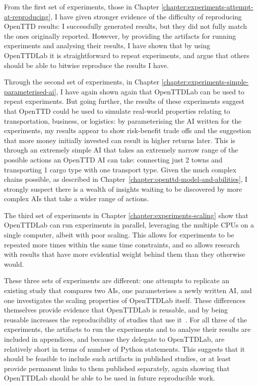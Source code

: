 \documentclass[logo,msc,dsti]{style/infthesis}    %
\begin{document}
{From the first set of experiments, those in Chapter \ref{chapter:experiments-attempt-at-reproducing}, I have given stronger evidence of the difficulty of reproducing OpenTTD results: I successfully generated results, but they did not fully match the ones originally reported. However, by providing the artifacts for running experiments and analysing their results, I have shown that by using OpenTTDLab it is straightforward to repeat experiments, and argue that others should be able to bitwise reproduce the results I have.

Through the second set of experiments, in Chapter \ref{chapter:experiments-simple-parameterised-ai}, I have again shown again that OpenTTDLab can be used to repeat experiments. But going further, the results of these experiments suggest that OpenTTD could be used to simulate real-world properties relating to transportation, business, or logistics: by parameterising the AI written for the experiments, my results appear to show risk-benefit trade offs and the suggestion that more money initially invested can result in higher returns later. This is through an extremely simple AI that takes an extremely narrow range of the possible actions an OpenTTD AI can take: connecting just 2 towns and transporting 1 cargo type with one transport type. Given the much complex chains possible, as described in Chapter~\ref{chapter:openttd-model-and-abilities}, I strongly suspect there is a wealth of insights waiting to be discovered by more complex AIs that take a wider range of actions.

The third set of experiments in Chapter \ref{chapter:experiments-scaling} show that OpenTTDLab can run experiments in parallel, leveraging the multiple CPUs on a single computer, albeit with poor scaling. This allows for experiments to be repeated more times within the same time constraints, and so allows research with results that have more evidential weight behind them than they otherwise would.

These three sets of experiments are different: one attempts to replicate an existing study that compares two AIs, one parameterises a newly written AI, and one investigates the scaling properties of OpenTTDLab itself. These differences themselves provide evidence that OpenTTDLab is reusable, and by being reusable increases the reproducibility of studies that use it~\cite{benureau2018re}. For all three of the experiments, the artifacts to run the experiments and to analyse their results are included in appendices, and because they delegate to OpenTTDLab, are relatively short in terms of number of Python statements. This suggests that it should be feasible to include such artifacts in published studies, or at least provide permanent links to them published separately, again showing that OpenTTDLab should be able to be used in future reproducible work.

}
\end{document}
